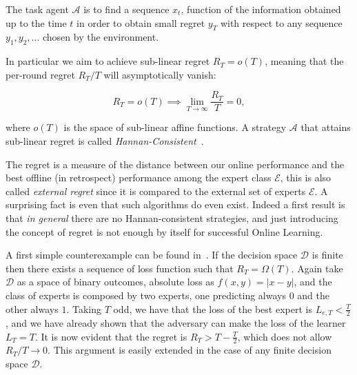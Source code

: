 The task agent $\mathcal A$ is to find a sequence $x_t$, function of the information obtained up to the time $t$ in order to obtain small regret $y_T$ with respect to any sequence $y_1,y_2,\ldots$ chosen by the environment.

In particular we aim to achieve sub-linear regret $R_T= o(T)$, meaning that the per-round regret $R_T/T$ will asymptotically vanish: 

\begin{equation}
	R_T= o(T) \implies \lim\limits_{T\to \infty}\frac{R_T}{T}=0,
\end{equation}

where $ o(T)$ is the space of sub-linear affine functions. A strategy $\mathcal A$ that attains sub-linear regret is called \emph{Hannan-Consistent}~\cite{hannan1957approximation}.

The regret is a measure of the distance between our online performance and the best offline (in retrospect) performance among the expert class $\mathcal E$, this is also called \emph{external regret} since it is compared to the external set of experts $\mathcal E$. A surprising fact is even that such algorithms do even exist.
Indeed a first result is that \emph{in general} there are no Hannan-consistent strategies, and just introducing the concept of regret is not enough by itself for successful Online Learning. 

A first simple counterexample can be found in~\cite{cover1966behavior}. If the decision space $\mathcal D$ is finite then there exists a sequence of loss function such that $R_T=\Omega(T)$.
Again take $\mathcal D$ as a space of binary outcomes, absolute loss as $f(x,y)=|x - y|$, and the class of experts is composed by two experts, one predicting always $0$ and the other always $1$. Taking $T$ odd, we have that the loss of the best expert is $L_{e,T}<\frac{T}{2}$, and we have already shown that the adversary can make the loss of the learner $L_T=T$. It is now evident that the regret is $R_T>T-\frac{T}{2}$, which does not allow $R_T/T\to 0$. This argument is easily extended in the case of any finite decision space $\mathcal D$.

